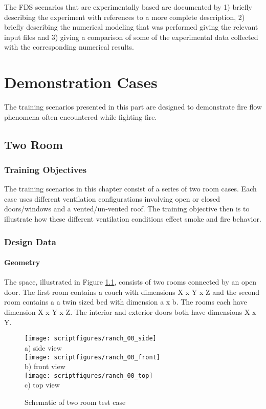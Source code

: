 \documentclass[11pt]{book}
\begin{document}
The FDS scenarios that are experimentally based are documented by 1) briefly describing the experiment with references to a more complete description, 2) briefly describing the numerical modeling that was performed giving the relevant input files and 3) giving a comparison of some of the experimental data collected with the corresponding numerical results.


\part{Demonstration Cases}
The training scenarios presented in this part are designed to demonstrate fire flow phenomena often encountered while fighting fire.



\chapter{Two Room}
\section{Training Objectives}
The training scenarios in this chapter consist of a series of two room cases.  Each case uses different ventilation configurations
involving open or closed doors/windows and a vented/un-vented roof.  The training
objective then is to illustrate how these different ventilation conditions effect smoke and fire behavior.

\section{Design Data}
\subsection{Geometry}
The space, illustrated in Figure \ref{fig2roomplan}, consists of two rooms connected by an open door.  The first room contains a couch
with dimensions X x Y x Z and the second
room contains a a twin sized bed with dimension a x b.  The rooms
each have dimension X x Y x Z.  The interior and exterior doors both have
dimensions X x Y.

\begin{figure}[\figoptions]
\begin{center}
\texttt{[image: scriptfigures/ranch\_00\_side]}\\
a) side view\\
\texttt{[image: scriptfigures/ranch\_00\_front]}\\
b) front view\\
\texttt{[image: scriptfigures/ranch\_00\_top]}\\
c) top view
\end{center}
\caption {Schematic of two room test case}
\label{fig2roomplan}%
\end{figure}
\end{document}
